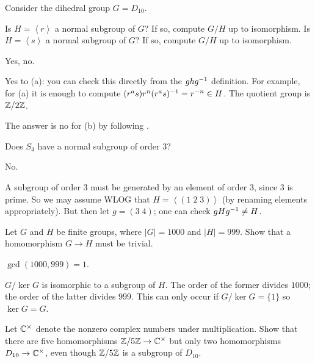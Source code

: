 \begin{problem}
	Consider the dihedral group $G = D_{10}$.
	\begin{enumerate}[(a)]
		\ii Is $H = \left< r \right>$ a normal subgroup of $G$?
		If so, compute $G/H$ up to isomorphism.
		\ii Is $H = \left< s \right>$ a normal subgroup of $G$?
		If so, compute $G/H$ up to isomorphism.
	\end{enumerate}
	\begin{hint}
		Yes, no.
	\end{hint}
	\begin{sol}
		Yes to (a): you can check this directly
		from the $ghg^{-1}$ definition.
		For example, for (a)
		it is enough to compute $(r^a s) r^n (r^a s)^{-1} = r^{-n} \in H$.
		The quotient group is $\mathbb Z/2\mathbb Z$.

		The answer is no for (b) by following
		.
	\end{sol}
\end{problem}

\begin{problem}
	Does $S_4$ have a normal subgroup of order $3$?
	\begin{hint}
		No.
	\end{hint}
	\begin{sol}
		A subgroup of order $3$ must be generated by
		an element of order $3$, since $3$ is prime.
		So we may assume WLOG that $H = \left< (1\; 2 \; 3) \right>$
		(by renaming elements appropriately).
		But then let $g = (3 \; 4)$; one can check $gHg^{-1} \ne H$.
	\end{sol}
\end{problem}

\begin{problem}
	Let $G$ and $H$ be finite groups, where $\left\lvert G \right\rvert = 1000$
	and $\left\lvert H \right\rvert = 999$.
	Show that a homomorphism $G \to H$ must be trivial.
	\begin{hint}
		$\gcd(1000,999)=1$.
	\end{hint}
	\begin{sol}
		$G/\ker G$ is isomorphic to a subgroup of $H$.
		The order of the former divides $1000$;
		the order of the latter divides $999$.
		This can only occur if $G / \ker G = \{1\}$
		so $\ker G = G$.
	\end{sol}
\end{problem}

\begin{problem}
	Let $\mathbb C^\times$ denote the nonzero complex numbers under multiplication.
	Show that there are five homomorphisms $\mathbb Z/5\mathbb Z \to \mathbb C^\times$
	but only two homomorphisms $D_{10} \to \mathbb C^\times$,
	even though $\mathbb Z/5\mathbb Z$ is a subgroup of $D_{10}$.
\end{problem}

